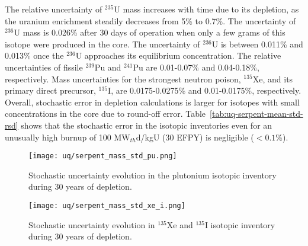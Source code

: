 The relative uncertainty of $^{235}$U mass increases with time due to its 
depletion, as the uranium enrichment steadily decreases from 5\% to 0.7\%.
The uncertainty of $^{236}$U mass is 
0.026\% after 30 days of operation when only a few grams of this isotope were 
produced in the core. The uncertainty of $^{236}$U is between 0.011\% and 
0.013\% once the $^{236}$U approaches its equilibrium concentration. The 
relative uncertainties of fissile $^{239}$Pu and $^{241}$Pu are 0.01-0.07\% 
and 0.04-0.18\%, respectively. Mass uncertainties for the 
strongest neutron poison, $^{135}$Xe, and its primary direct precursor, 
$^{135}$I, are 0.0175-0.0275\% and 0.01-0.0175\%, respectively. Overall, 
stochastic error in depletion calculations is larger for isotopes with small 
concentrations in the core due to round-off error. 
Table~\ref{tab:uq-serpent-mean-std-rsd} shows that the stochastic error in the 
isotopic inventories even for an unusually high burnup of 100 MW$_{th}$d/kgU 
(30 EFPY) is negligible ($<0.1$\%).

\begin{figure}[htp!] %
	\centering
	\texttt{[image: uq/serpent\_mass\_std\_pu.png]}
	\vspace{-3mm}
	\caption{Stochastic uncertainty evolution in the plutonium isotopic 
		inventory during 30 years of depletion.}
	\label{fig:uq-serpent-pu}
\end{figure}
	\vspace{-9mm}
\begin{figure}[hbp!] %
	\centering
	\texttt{[image: uq/serpent\_mass\_std\_xe\_i.png]}
		\vspace{-3mm}
	\caption{Stochastic uncertainty evolution in $^{135}$Xe and $^{135}$I 
	isotopic inventory during 30 years of depletion.}
	\label{fig:uq-serpent-xe-i}
\end{figure}


